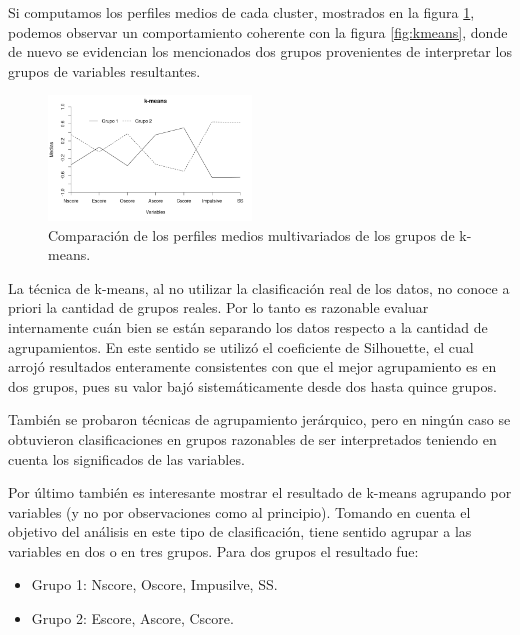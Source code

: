 \documentclass[a4paper,twocolumn]{article}
\begin{document}
Si computamos los perfiles medios de cada cluster, mostrados en la figura \ref{fig:perfMedios_kmeans}, podemos observar un comportamiento coherente con la figura \ref{fig:kmeans}, donde de nuevo se evidencian los mencionados dos grupos provenientes de interpretar los grupos de variables resultantes.

\begin{figure}[h]
	\centering
	\includegraphics[trim={0.1cm 1.6cm 0.8cm 0.7cm}, clip=true, width=0.48\textwidth]{perfilesMedios_kmeans.png}
	\caption{Comparación de los perfiles medios multivariados de los grupos de k-means.}
	\label{fig:perfMedios_kmeans}
\end{figure}

La técnica de k-means, al no utilizar la clasificación real de los datos, no conoce a priori la cantidad de grupos reales. Por lo tanto es razonable evaluar internamente cuán bien se están separando los datos respecto a la cantidad de agrupamientos. En este sentido se utilizó el coeficiente de Silhouette, el cual arrojó resultados enteramente consistentes con que el mejor agrupamiento es en dos grupos, pues su valor bajó sistemáticamente desde dos hasta quince grupos.

También se probaron técnicas de agrupamiento jerárquico, pero en ningún caso se obtuvieron clasificaciones en grupos razonables de ser interpretados teniendo en cuenta los significados de las variables.

Por último también es interesante mostrar el resultado de k-means agrupando por variables (y no por observaciones como al principio). Tomando en cuenta el objetivo del análisis en este tipo de clasificación, tiene sentido agrupar a las variables en dos o en tres grupos. Para dos grupos el resultado fue:

\begin{itemize}
	\item Grupo 1: Nscore, Oscore, Impusilve, SS.
	\item Grupo 2: Escore, Ascore, Cscore.
\end{itemize}
\end{document}
